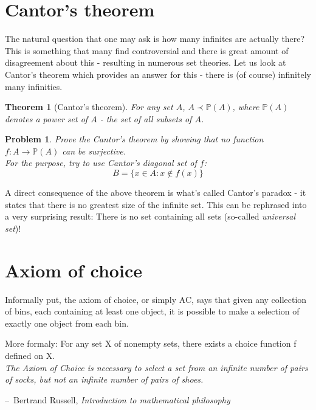 \documentclass[11pt,a5paper]{article}
\makeatletter
\newtheorem{theorem}{Theorem}
\newtheorem{problem}{Problem}
\newenvironment{chapquote}[2][2em]
  {\setlength{\@tempdima}{#1}%
   \def\chapquote@author{#2}%
   \parshape 1 \@tempdima \dimexpr\textwidth-2\@tempdima\relax%
   \itshape}
  {\par\normalfont\hfill--\ \chapquote@author\hspace*{\@tempdima}\par\bigskip}
\makeatother
\begin{document}
\section{Cantor's theorem}

The natural question that one may ask is how many infinites are actually there? This is something that many find controversial and there is great amount of disagreement about this - resulting in numerous set theories. 
Let us look at Cantor's theorem which provides an answer for this - there is (of course) infinitely many infinities.

\begin{theorem}[Cantor's theorem]
For any set $A$, $A\prec \mathbb{P}(A)$, where $\mathbb{P}(A)$ denotes a \emph{power set} of $A$ - the set of all subsets of $A$.
\end{theorem}

\begin{problem}
Prove the Cantor's theorem by showing that no function \\ $f: A \rightarrow \mathbb{P}(A)$ can be surjective. \\
For the purpose, try to use \emph{Cantor's diagonal set of $f$}: \[B = \{{x \in A : x \notin f(x)}\}\]
\end{problem}

\noindent A direct consequence of the above theorem is what's called Cantor's paradox - it states that there is no greatest size of the infinite set. This can be rephrased into a very surprising result: There is no set containing all sets (so-called \emph{universal set})!

\section{Axiom of choice}

\noindent Informally put, the axiom of choice, or simply AC, says that given any collection of bins, each containing at least one object, it is possible to make a selection of exactly one object from each bin.

\noindent More formaly: For any set X of nonempty sets, there exists a choice function f defined on X.
\\

\begin{chapquote}{Bertrand Russell, \textit{Introduction to mathematical philosophy}}
\noindent The Axiom of Choice is necessary to select a set from an infinite number of pairs of socks, but not an infinite number of pairs of shoes.
\end{chapquote}	
\end{document}
